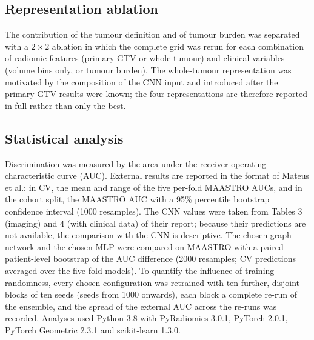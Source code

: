 \documentclass[11pt,a4paper]{article}
\begin{document}
\subsection{Representation ablation}
The contribution of the tumour definition and of tumour burden was separated with a $2\times2$ ablation in which the complete grid was rerun for each combination of radiomic features (primary GTV or whole tumour) and clinical variables (volume bins only, or tumour burden). The whole-tumour representation was motivated by the composition of the CNN input and introduced after the primary-GTV results were known; the four representations are therefore reported in full rather than only the best.

\subsection{Statistical analysis}
Discrimination was measured by the area under the receiver operating characteristic curve (AUC). External results are reported in the format of Mateus et al.\cite{mateus2023}: in CV, the mean and range of the five per-fold MAASTRO AUCs, and in the cohort split, the MAASTRO AUC with a 95\% percentile bootstrap confidence interval (1000 resamples)\cite{efron1993}. The CNN values were taken from Tables 3 (imaging) and 4 (with clinical data) of their report; because their predictions are not available, the comparison with the CNN is descriptive. The chosen graph network and the chosen MLP were compared on MAASTRO with a paired patient-level bootstrap of the AUC difference (2000 resamples; CV predictions averaged over the five fold models). To quantify the influence of training randomness, every chosen configuration was retrained with ten further, disjoint blocks of ten seeds (seeds from 1000 onwards), each block a complete re-run of the ensemble, and the spread of the external AUC across the re-runs was recorded. Analyses used Python 3.8 with PyRadiomics 3.0.1\cite{vangriethuysen2017}, PyTorch 2.0.1\cite{paszke2019pytorch}, PyTorch Geometric 2.3.1\cite{fey2019pyg} and scikit-learn 1.3.0\cite{pedregosa2011sklearn}.
\end{document}
